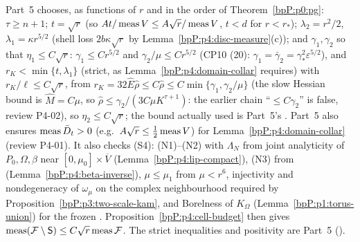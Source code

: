 \begin{remark}\label{bpP:p4:use5}
Part~5 chooses, as functions of $r$ and in the order of Theorem~\ref{bpP:p0:pg}: $\tau\ge n+1$; $t=\sqrt r$ (so $At/\operatorname{meas} V\le A\sqrt r/\operatorname{meas} V$, $t<d$ for $r<r_*$); $\lambda_2=r^2/2$, $\lambda_1=\kappa r^{5/2}$ (shell loss $2b\kappa\sqrt r$ by Lemma~\ref{bpP:p4:disc-measure}(c)); and $\gamma_1,\gamma_2$ so that $\eta_1\le C\sqrt r$: $\gamma_1\le Cr^{5/2}$ and $\gamma_2/\mu\le Cr^{5/2}$ (CP10 (20): $\gamma_1=\bar\gamma_2=\gamma_*^2\varepsilon^{5/2}$), and $r_K<\min\{t,\lambda_1\}$ (strict, as Lemma~\ref{bpP:p4:domain-collar} requires) with $r_K/\ell\le C\sqrt r$, from $r_K=32\hat E\hat\rho\le C\hat\rho\le C\min\{\gamma_1,\gamma_2/\mu\}$ (the slow Hessian bound is $\hat M=C\mu$, so $\hat\rho\le\gamma_2/(3C\mu K^{\tau+1})$: the earlier chain ``$\le C\gamma_2$'' is false, review P4-02), so $\eta_2\le C\sqrt r$; the bound actually used is Part~5's . Part~5 also ensures $\operatorname{meas}\bar D_t>0$ (e.g.\ $A\sqrt r\le\frac12\operatorname{meas} V$) for Lemma~\ref{bpP:p4:domain-collar} (review P4-01). It also checks (S4): (N1)--(N2) with $\Lambda_N$ from joint analyticity of $P_0,\Omega,\beta$ near $[0,\mu_0]\times\overline V$ (Lemma~\ref{bpP:p4:lip-compact}), (N3) from  (Lemma~\ref{bpP:p4:beta-inverse}), $\mu\le\mu_1$ from $\mu<r^6$, injectivity and nondegeneracy of $\omega_\mu$ on the complex neighbourhood required by Proposition~\ref{bpP:p3:two-scale-kam}, and Borelness of $K_\Omega$ (Lemma~\ref{bpP:p1:torus-union}) for the frozen . Proposition~\ref{bpP:p4:cell-budget} then gives $\operatorname{meas}(\mathcal F\setminus\mathsf S)\le C\sqrt r\operatorname{meas}\mathcal F$. The strict inequalities and positivity are Part~5 ().
\end{remark}

